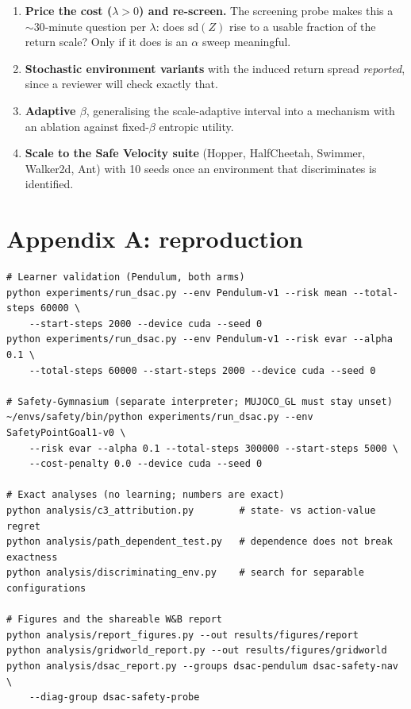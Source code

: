 \documentclass[11pt,a4paper]{article}
\begin{document}
\begin{enumerate}[leftmargin=1.5em,itemsep=0.3em]
\item \textbf{Price the cost ($\lambda > 0$) and re-screen.} The screening probe
      makes this a ${\sim}30$-minute question per $\lambda$: does
      $\mathrm{sd}(Z)$ rise to a usable fraction of the return scale? Only if it
      does is an $\alpha$ sweep meaningful.
\item \textbf{Stochastic environment variants} with the induced return spread
      \emph{reported}, since a reviewer will check exactly that.
\item \textbf{Adaptive $\beta$}, generalising the scale-adaptive interval into a
      mechanism with an ablation against fixed-$\beta$ entropic utility.
\item \textbf{Scale to the Safe Velocity suite} (Hopper, HalfCheetah, Swimmer,
      Walker2d, Ant) with 10 seeds once an environment that discriminates is
      identified.
\end{enumerate}

\section*{Appendix A: reproduction}

\small
\begin{verbatim}
# Learner validation (Pendulum, both arms)
python experiments/run_dsac.py --env Pendulum-v1 --risk mean --total-steps 60000 \
    --start-steps 2000 --device cuda --seed 0
python experiments/run_dsac.py --env Pendulum-v1 --risk evar --alpha 0.1 \
    --total-steps 60000 --start-steps 2000 --device cuda --seed 0

# Safety-Gymnasium (separate interpreter; MUJOCO_GL must stay unset)
~/envs/safety/bin/python experiments/run_dsac.py --env SafetyPointGoal1-v0 \
    --risk evar --alpha 0.1 --total-steps 300000 --start-steps 5000 \
    --cost-penalty 0.0 --device cuda --seed 0

# Exact analyses (no learning; numbers are exact)
python analysis/c3_attribution.py        # state- vs action-value regret
python analysis/path_dependent_test.py   # dependence does not break exactness
python analysis/discriminating_env.py    # search for separable configurations

# Figures and the shareable W&B report
python analysis/report_figures.py --out results/figures/report
python analysis/gridworld_report.py --out results/figures/gridworld
python analysis/dsac_report.py --groups dsac-pendulum dsac-safety-nav \
    --diag-group dsac-safety-probe
\end{verbatim}
\normalsize
\end{document}
